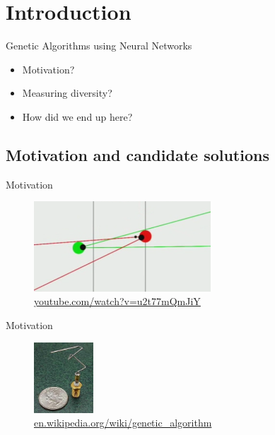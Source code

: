 
\section{Introduction}

\begin{frame}{Genetic Algorithms using Neural Networks}

  \begin{itemize}
    \item Motivation?
    \item Measuring diversity?
    \item How did we end up here?
  \end{itemize}
\end{frame}

\subsection{Motivation and candidate solutions}

\begin{frame}{Motivation}
  \begin{figure}
    \centering
    \includegraphics[width=250px]{elias/images/sniper.png}
    \caption{\url{youtube.com/watch?v=u2t77mQmJiY}}
  \end{figure}
\end{frame}


\begin{frame}{Motivation}
  \begin{figure}
    \centering
    \includegraphics[height=100px]{elias/images/antenna.jpg}
    \caption{\url{en.wikipedia.org/wiki/genetic_algorithm}}
  \end{figure}
\end{frame}

